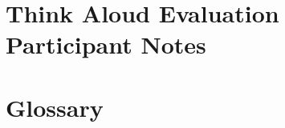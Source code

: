 \documentclass{l3proj}
\begin{document}
\chapter{Think Aloud Evaluation Participant Notes}



\chapter{Glossary}









\end{document}
